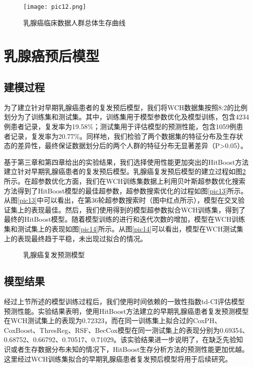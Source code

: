 \begin{figure}[H]
\texttt{[image: pic12.png]}
\caption{乳腺癌临床数据人群总体生存曲线}
\label{pic12}
\end{figure}

\section{乳腺癌预后模型}

\subsection{建模过程}
为了建立针对早期乳腺癌患者的复发预后模型，我们将WCH数据集按照8:2的比例划分为了训练集和测试集。其中，训练集用于模型参数优化及模型训练，包含4234例患者记录，复发率为19.58\%；测试集用于评估模型的预测性能，包含1059例患者记录，复发率为20.77\%。同样地，我们检验了两个数据集的特征分布及生存状态的差异性，最终保证数据划分后的两个人群的特征分布无显著差异（P>0.05）。

基于第三章和第四章给出的实验结果，我们选择使用性能更加突出的HitBoost方法建立针对早期乳腺癌患者的复发预后模型。乳腺癌复发预后模型的建立过程如图\ref{pic1314}所示。在超参数优化方面，我们在WCH训练集数据上利用贝叶斯超参数优化搜索方法得到了HitBoost模型的最佳超参数，超参数搜索优化的过程如图\ref{pic13}所示。从图\ref{pic13}中可以看出，在第36轮超参数搜索时（图中红点所示），模型在交叉验证集上的表现最佳。然后，我们使用得到的模型超参数拟合WCH训练集，得到了最终的HitBoost模型。随着模型训练的进行和迭代次数的增加，模型在WCH训练集和测试集上的表现如图\ref{pic14}所示。从图\ref{pic14}可以看出，模型在WCH测试集上的表现最终趋于平稳，未出现过拟合的情况。

\begin{figure}[H]
\centering 
{}
\hspace{0.01\linewidth}
\caption{乳腺癌复发预测模型}
\label{pic1314}
\end{figure}

\subsection{模型结果}

经过上节所述的模型训练过程后，我们使用时间依赖的一致性指数td-CI评估模型预测性能。实验结果表明，使用HitBoost方法建立的早期乳腺癌患者复发预测模型在WCH测试集上的表现为0.72323，而在同一训练集上拟合过的CoxPH、CoxBoost、ThresReg、RSF、BecCox模型在同一测试集上的表现分别为0.69354、0.68752、0.66792、0.70517、0.71029。该实验结果进一步说明了，在缺乏先验知识或者生存数据分布未知的情况下，HitBoost生存分析方法的预测性能更加优越。这里经过WCH训练集拟合的早期乳腺癌患者复发预后模型将用于后续研究。

